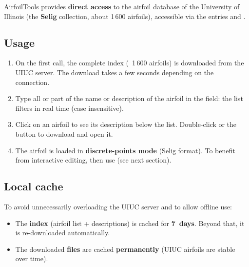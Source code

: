 AirfoilTools provides \textbf{direct access} to the airfoil database
of the University of Illinois (the \textbf{Selig} collection,
about 1\,600 airfoils), accessible via the entries
 and .


\subsection{Usage}

\begin{enumerate}
    \item On the first call, the complete index (~1\,600 airfoils) is
        downloaded from the UIUC server. The download takes a few
        seconds depending on the connection.
    \item Type all or part of the name or description of the airfoil
        in the  field: the list filters in real time
        (case insensitive).
    \item Click on an airfoil to see its description below the list.
        Double-click or the  button to download and open
        it.
    \item The airfoil is loaded in \textbf{discrete-points mode}
        (Selig format). To benefit from interactive editing, then use
         (see next
        section).
\end{enumerate}

\subsection{Local cache}

To avoid unnecessarily overloading the UIUC server and to allow
offline use:

\begin{itemize}
    \item The \textbf{index} (airfoil list + descriptions) is cached
        for \textbf{7~days}. Beyond that, it is re-downloaded
        automatically.
    \item The downloaded \textbf{ files} are cached
        \textbf{permanently} (UIUC airfoils are stable over time).
\end{itemize}

